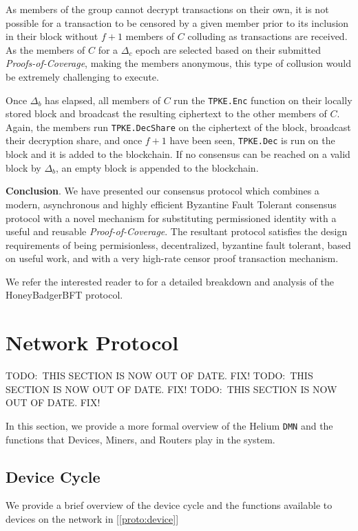 \documentclass[10pt, nonatbib, nocopyrightspace, reprint]{sigplanconf}
\newcommand{\todo}[1]{}
\renewcommand{\todo}[1]{{\color{red} TODO:\ {#1}}}
\newcommand{\protoref}[1]{[\autoref{#1}]}
\begin{document}
As members of the group cannot decrypt transactions on their own, it is not possible for a transaction to be censored by a given member prior to its inclusion in their block without $f + 1$ members of $C$ colluding as transactions are received. As the members of $C$ for a $\Delta_c$ epoch are selected based on their submitted \emph{Proofs-of-Coverage}, making the members anonymous, this type of collusion would be extremely challenging to execute.

Once $\Delta_b$ has elapsed, all members of $C$ run the \verb|TPKE.Enc| function on their locally stored block and broadcast the resulting ciphertext to the other members of $C$. Again, the members run \verb|TPKE.DecShare| on the ciphertext of the block, broadcast their decryption share, and once $f + 1$ have been seen, \verb|TPKE.Dec| is run on the block and it is added to the blockchain. If no consensus can be reached on a valid block by $\Delta_b$, an empty block is appended to the blockchain.

\textbf{Conclusion}. We have presented our consensus protocol which combines a modern, asynchronous and highly efficient Byzantine Fault Tolerant consensus protocol with a novel mechanism for substituting permissioned identity with a useful and reusable \emph{Proof-of-Coverage}. The resultant protocol satisfies the design requirements of being permisionless, decentralized, byzantine fault tolerant, based on useful work, and with a very high-rate censor proof transaction mechanism.

We refer the interested reader to \cite{honeybadger} for a detailed breakdown and analysis of the HoneyBadgerBFT protocol.

\iffalse

\section{Network Protocol}

\todo{THIS SECTION IS NOW OUT OF DATE. FIX!}
\todo{THIS SECTION IS NOW OUT OF DATE. FIX!}
\todo{THIS SECTION IS NOW OUT OF DATE. FIX!}

In this section, we provide a more formal overview of the Helium \verb|DMN| and the functions that Devices, Miners, and Routers play in the system.

\subsection{Device Cycle}

We provide a brief overview of the device cycle and the functions available to devices on the network in \protoref{proto:device}
\end{document}
